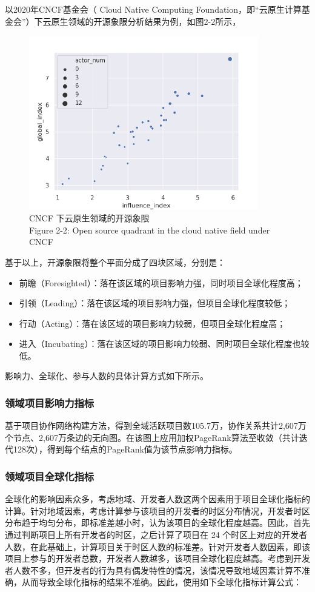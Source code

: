 \par 以2020年CNCF基金会（ Cloud Native Computing Foundation，即“云原生计算基金会”）下云原生领域的开源象限分析结果为例，如图2-2所示，
\begin{figure}[H]
    \centering
    \includegraphics[width=100mm]{./figures/开源象限.png}
    \caption{CNCF 下云原生领域的开源象限\\Figure 2-2: Open source quadrant in the cloud native field under CNCF}
\end{figure}
基于以上，开源象限将整个平面分成了四块区域，分别是：
\begin{itemize}
    \item 前瞻（Foresighted）：落在该区域的项目影响力强，同时项目全球化程度高；
    \item 引领（Leading）：落在该区域的项目影响力强，但项目全球化程度较低；
    \item 行动（Acting）：落在该区域的项目影响力较弱，但项目全球化程度高；
    \item 进入（Incubating）：落在该区域的项目影响力较弱、同时项目全球化程度也较低。
\end{itemize}
\par 影响力、全球化、参与人数的具体计算方式如下所示。

\subsubsection{领域项目影响力指标}
\par 基于项目协作网络构建方法，得到全域活跃项目数105.7万，协作关系共计2,607万个节点、2,607万条边的无向图。在该图上应用加权PageRank算法至收敛（共计迭代128次），得到每个结点的PageRank值为该节点影响力指标。

\subsubsection{领域项目全球化指标}
\par 全球化的影响因素众多，考虑地域、开发者人数这两个因素用于项目全球化指标的计算。针对地域因素，考虑计算参与该项目的开发者的时区分布情况，开发者时区分布趋于均匀分布，即标准差越小时，认为该项目的全球化程度越高。因此，首先通过判断项目上所有开发者的时区，之后计算了项目在 24 个时区上对应的开发者人数，在此基础上，计算项目关于时区人数的标准差。针对开发者人数因素，即该项目上参与的开发者总数，开发者人数越多，该项目全球化程度越高。考虑到开发者人数不多，但开发者的行为具有偶发特性的情况，该情况导致地域因素计算不准确，从而导致全球化指标的结果不准确。因此，使用如下全球化指标计算公式：

